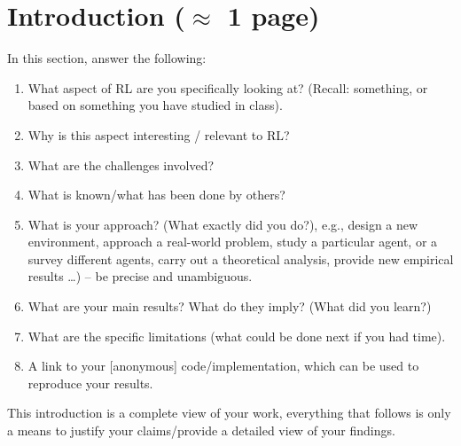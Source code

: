 \documentclass[../CSC_52081_EP.tex]{subfiles}
\begin{document}
    \section{Introduction ($\approx$ 1 page)}
    \label{sec:intro}

    In this section, answer the following:

    \begin{enumerate}
        \item What aspect of RL are you specifically looking at? (Recall: something, or based on something you have studied in class).
        \item Why is this aspect interesting / relevant to RL?
        \item What are the challenges involved?
        \item What is known/what has been done by others?
        \item \label{item:approach} What is your approach? (What exactly did you do?), e.g., design a new environment, approach a real-world problem, study a particular agent, or a survey different agents, carry out a theoretical analysis, provide new empirical results \ldots) -- be precise and unambiguous.
        \item What are your main results? What do they imply? (What did you learn?)
        \item What are the specific limitations (what could be done next if you had time).
        \item A link to your [anonymous] code/implementation, which can be used to reproduce your results.
    \end{enumerate}

    This introduction is a complete view of your work, everything that follows is only a means to justify your claims/provide a detailed view of your findings. 
\end{document}
